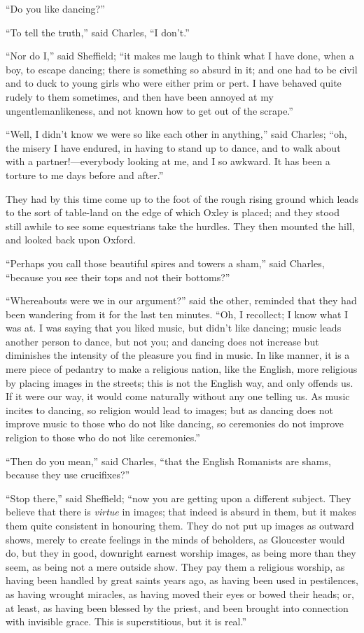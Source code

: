 ``Do you like dancing?''

``To tell the truth,'' said Charles, ``I don't.''

``Nor do I,'' said Sheffield; ``it makes me laugh to
think what I have done, when a boy, to escape dancing; there is
something so absurd in it; and one had to be civil and to duck to
young girls who were either prim or pert. I have behaved quite rudely
to them sometimes, and then have been annoyed at my
ungentlemanlikeness, and not known how to get out of the scrape.''

``Well, I didn't know we were so like each other in
anything,'' said Charles; ``oh, the misery I have endured, in
having to stand up to dance, and to walk about with a partner!—everybody
looking at me, and I so awkward. It has been a torture to me days
before and after.''

They had by this time come up to the foot of the rough rising
ground which leads to the sort of table-land on the edge of which
Oxley is placed; and they stood still awhile to see some equestrians
take the hurdles. They then mounted the hill, and looked back upon
Oxford.

``Perhaps you call those beautiful spires and towers a
sham,'' said Charles, ``because you see their tops and not
their bottoms?''

``Whereabouts were we in our argument?'' said the other,
reminded that they had been wandering from it for the last ten
minutes. ``Oh, I recollect; I know what I was at. I was saying
that you liked music, but didn't like dancing; music leads
another person to dance, but not you; and dancing does not increase
but diminishes the intensity of the pleasure you find in music. In
like manner, it is a mere piece of pedantry to make a religious
nation, like the English, more religious by placing images in the
streets; this is not the English way, and only offends us. If it were
our way, it would come naturally without any one telling us. As music
incites to dancing, so religion would lead to images; but as dancing
does not improve music to those who do not like dancing, so ceremonies
do not improve religion to those who do not like ceremonies.''

``Then do you mean,'' said Charles, ``that the English
Romanists are shams, because they use crucifixes?''

``Stop there,'' said Sheffield; ``now you are getting
upon a different subject. They believe that there is \emph{virtue} in
images; that indeed is absurd in them, but it makes them quite
consistent in honouring them. They do not put up images as outward
shows, merely to create feelings in the minds of beholders, as
Gloucester would do, but they in good, downright earnest worship
images, as being more than they seem, as being not a mere outside
show. They pay them a religious worship, as having been handled by
great saints years ago, as having been used in pestilences, as having
wrought miracles, as having moved their eyes or bowed their heads; or,
at least, as having been blessed by the priest, and been brought into
connection with invisible grace. This is superstitious, but it is
real.''

